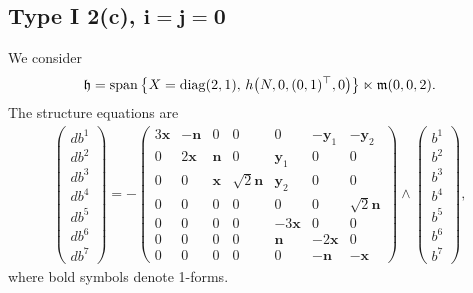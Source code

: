 \documentclass[11pt]{article}
\numberwithin{equation}{section}
\newcommand\fh{{\frak h}}
\newcommand\fm{{\frak m}}
\newcommand\bx{{\mathbf x}}
\newcommand\by{{\mathbf y}}
\newcommand\bn{{\mathbf n}}
\newcommand{\Span}{\operatorname{span}}
\newcommand{\diag}{\operatorname{diag}}
\begin{document}
\subsection[Type I 2(c), $i=j=0$]{Type I 2(c), $\boldsymbol{i=j=0}$}
We consider
\begin{gather*}\fh=\Span\big\{X=\diag(2,1),\, h\big(N,0,(0,1)^\top,0\big) \big\}\ltimes\fm(0,0,2).\end{gather*}
The structure equations are
\begin{gather}\label{EI2(c)}\left(\begin{matrix} db^1\\db^2\\db^3\\db^4\\db^5\\db^6\\db^7\end{matrix}\right) = -\left(
\begin{matrix}
3{\bx} &-\bn&0&0&0&-\by_1&-\by_2\\
0&2\bx&\bn&0&\by_1&0&0\\
0&0&\bx&\sqrt 2 \bn&\by_2&0&0\\
0&0&0&0&0&0&\sqrt 2 \bn\\
0&0&0&0&-3\bx&0&0\\
0&0&0&0&\bn&-2\bx&0\\
0&0&0&0&0&-\bn&-\bx
\end{matrix}\right) \wedge \left(\begin{matrix} b^1\\b^2\\b^3\\b^4\\b^5\\b^6\\b^7\end{matrix}\right),
\end{gather}
where bold symbols denote 1-forms.
\end{document}
